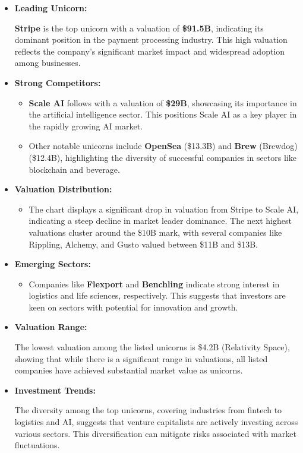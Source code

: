 \documentclass[a4paper,12pt]{article}
\begin{document}
\begin{itemize}
\item \textbf{Leading Unicorn:}

\textbf{Stripe} is the top unicorn with a valuation of \textbf{\$91.5B}, indicating its dominant position in the payment processing industry. This high valuation reflects the company's significant market impact and widespread adoption among businesses.

\item \textbf{Strong Competitors:}

\begin{itemize}
\item \textbf{Scale AI} follows with a valuation of \textbf{\$29B}, showcasing its importance in the artificial intelligence sector. This positions Scale AI as a key player in the rapidly growing AI market.
\item Other notable unicorns include \textbf{OpenSea} (\$13.3B) and \textbf{Brew} (Brewdog) (\$12.4B), highlighting the diversity of successful companies in sectors like blockchain and beverage.
\end{itemize}

\item \textbf{Valuation Distribution:}

\begin{itemize}
\item The chart displays a significant drop in valuation from Stripe to Scale AI, indicating a steep decline in market leader dominance. The next highest valuations cluster around the \$10B mark, with several companies like Rippling, Alchemy, and Gusto valued between \$11B and \$13B.
\end{itemize}

\item \textbf{Emerging Sectors:}

\begin{itemize}
\item Companies like \textbf{Flexport} and \textbf{Benchling} indicate strong interest in logistics and life sciences, respectively. This suggests that investors are keen on sectors with potential for innovation and growth.
\end{itemize}

\item \textbf{Valuation Range:}

The lowest valuation among the listed unicorns is \$4.2B (Relativity Space), showing that while there is a significant range in valuations, all listed companies have achieved substantial market value as unicorns.

\item \textbf{Investment Trends:}

The diversity among the top unicorns, covering industries from fintech to logistics and AI, suggests that venture capitalists are actively investing across various sectors. This diversification can mitigate risks associated with market fluctuations.
\end{itemize}
\end{document}
